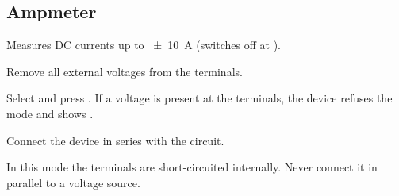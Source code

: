 \subsection{Ampmeter}
\label{sec:mode_amp}
Measures DC currents up to \qty{\pm10}{\ampere} (switches off at ).
\begin{steps}
    \item Remove all external voltages from the terminals.
    \item Select  and press . If a voltage is present at the terminals,
          the device refuses the mode and shows .
    \item Connect the device in series with the circuit.
\end{steps}
\begin{warning}
    In this mode the terminals are short-circuited internally. Never connect it in parallel to a
    voltage source.
\end{warning}
